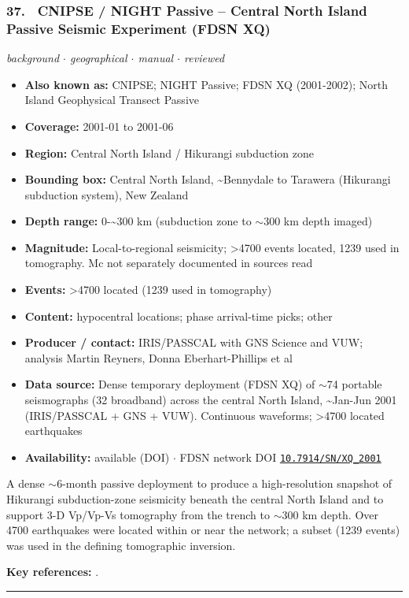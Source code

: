 \documentclass[10pt,a4paper]{article}
\newcommand{\catentryrule}{\par\vspace{3pt}\noindent\textcolor{rulegrey}{\rule{\linewidth}{0.3pt}}\par\vspace{5pt}}
\newcommand{\kv}[2]{\item \textbf{#1:} #2}
\begin{document}
\subsubsection*{\hypertarget{c:37}{37.}~ CNIPSE / NIGHT Passive -- Central North Island Passive Seismic Experiment (FDSN XQ)}
{\small\itshape background $\cdot$ geographical $\cdot$ manual $\cdot$ reviewed}\par\vspace{2pt}
\begin{itemize}[leftmargin=1.3em,itemsep=0.6pt,topsep=1pt,parsep=0pt]
\kv{Also known as}{CNIPSE; NIGHT Passive; FDSN XQ (2001-2002); North Island Geophysical Transect Passive}
\kv{Coverage}{2001-01 to 2001-06}
\kv{Region}{Central North Island / Hikurangi subduction zone}
\kv{Bounding box}{Central North Island, \textasciitilde{}Bennydale to Tarawera (Hikurangi subduction system), New Zealand}
\kv{Depth range}{0-\textasciitilde{}300 km (subduction zone to $\sim$300 km depth imaged)}
\kv{Magnitude}{Local-to-regional seismicity; \textgreater{}4700 events located, 1239 used in tomography. Mc not separately documented in sources read}
\kv{Events}{\textgreater{}4700 located (1239 used in tomography)}
\kv{Content}{hypocentral locations; phase arrival-time picks; other}
\kv{Producer / contact}{IRIS/PASSCAL with GNS Science and VUW; analysis Martin Reyners, Donna Eberhart-Phillips et al}
\kv{Data source}{Dense temporary deployment (FDSN XQ) of $\sim$74 portable seismographs (32 broadband) across the central North Island, \textasciitilde{}Jan-Jun 2001 (IRIS/PASSCAL + GNS + VUW). Continuous waveforms; \textgreater{}4700 located earthquakes}
\kv{Availability}{available (DOI) $\cdot$ FDSN network DOI \href{https://doi.org/10.7914/SN/XQ_2001}{\nolinkurl{10.7914/SN/XQ_2001}}}
\end{itemize}
\par\vspace{2pt}A dense $\sim$6-month passive deployment to produce a high-resolution snapshot of Hikurangi subduction-zone seismicity beneath the central North Island and to support 3-D Vp/Vp-Vs tomography from the trench to $\sim$300 km depth. Over 4700 earthquakes were located within or near the network; a subset (1239 events) was used in the defining tomographic inversion.
\par\vspace{2pt}\textbf{Key references:} \cite{Reyners2006,IRISPASSCAL2001}.
\catentryrule
\end{document}
